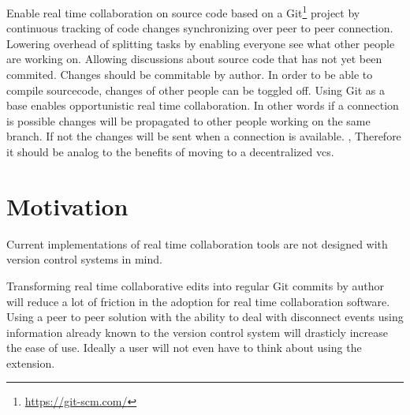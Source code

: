 Enable real time collaboration on source code based on a Git\footnote{\href{https://git-scm.com/}{https://git-scm.com/}} project by
continuous tracking of code changes synchronizing over peer to peer connection.
Lowering overhead of splitting tasks by enabling everyone see what other people are working on. Allowing discussions about source code that has not yet been commited.
Changes should be commitable by author. In order to be able to compile sourcecode, changes of other people can be toggled off.
Using Git as a base enables opportunistic real time collaboration. In other words if a connection is possible changes will be propagated  to other people working on the same branch. If not the changes will be sent when a connection is available. \cite{AlwisSillito:2009:centralToDecentralVCS},\cite{6188603} Therefore it should be analog to the benefits of moving to a decentralized vcs.

\section{Motivation}

Current implementations of real time collaboration tools are not designed with version control systems in mind.

Transforming real time collaborative edits into regular Git commits by author will reduce a lot of friction in the adoption for real time collaboration software. Using a peer to peer solution with the ability to deal with disconnect events using information already known to the version control system will drasticly increase the ease of use. Ideally a user will not even have to think about using the extension.